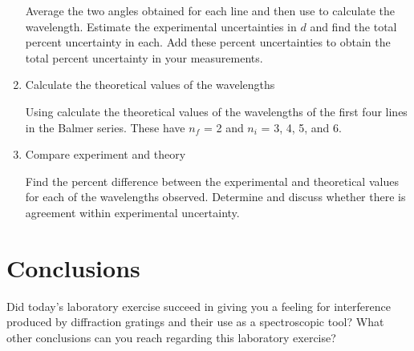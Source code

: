 \begin{multicols}{2}
\begin{enumerate}
	Average the two angles obtained for each line and then use  to calculate the wavelength.  Estimate the experimental uncertainties in $d$ and find the total percent uncertainty in each.  Add these percent uncertainties to obtain the total percent uncertainty in your measurements.
	\item Calculate the theoretical values of the wavelengths
	
	Using  calculate the theoretical values of the wavelengths of the first four lines in the Balmer series.  These have $n_f$ = 2 and $n_i$ = 3, 4, 5, and 6.
	\item Compare experiment and theory
	
	Find the percent difference between the experimental and theoretical values for each of the wavelengths observed. Determine and discuss whether there is agreement within experimental uncertainty. 
\end{enumerate}

\section{Conclusions}
Did today's laboratory exercise succeed in giving you a feeling for interference produced by diffraction gratings and their use as a spectroscopic tool?  What other conclusions can you reach regarding this laboratory exercise?

\end{multicols} 
\endinput
